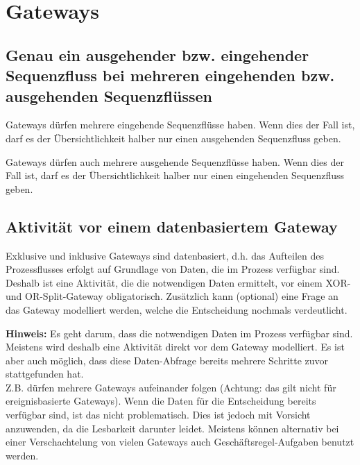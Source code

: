 \documentclass[12pt,report]{../../Templates/snetTeaching}
\begin{document}
\begin{Rahmen}
	\hfill
\end{Rahmen}







\clearpage
\section{Gateways}

\subsection{Genau ein ausgehender bzw. eingehender Sequenzfluss bei mehreren eingehenden bzw. ausgehenden Sequenzflüssen}


Gateways dürfen mehrere eingehende Sequenzflüsse haben. Wenn dies der Fall ist, darf es der Übersichtlichkeit halber nur einen ausgehenden Sequenzfluss geben.

Gateways dürfen auch mehrere ausgehende Sequenzflüsse haben. Wenn dies der Fall ist, darf es der Übersichtlichkeit halber nur einen eingehenden Sequenzfluss geben.

\begin{Rahmen}
	\hfill
\end{Rahmen}


\subsection{Aktivität vor einem datenbasiertem Gateway}

Exklusive und inklusive Gateways sind datenbasiert, d.h. das Aufteilen des Prozessflusses erfolgt auf Grundlage von Daten, die im Prozess verfügbar sind. Deshalb ist eine Aktivität, die die notwendigen Daten ermittelt, vor einem XOR- und OR-Split-Gateway obligatorisch. Zusätzlich kann (optional) eine Frage an das Gateway modelliert werden, welche die Entscheidung nochmals verdeutlicht.

\begin{Rahmen}
	\hfill
\end{Rahmen}

\textbf{Hinweis:} Es geht darum, dass die notwendigen Daten im Prozess verfügbar sind. Meistens wird deshalb eine Aktivität direkt vor dem Gateway modelliert. Es ist aber auch möglich, dass diese Daten-Abfrage bereits mehrere Schritte zuvor stattgefunden hat.\\
Z.B. dürfen mehrere Gateways aufeinander folgen (Achtung: das gilt nicht für ereignisbasierte Gateways). Wenn die Daten für die Entscheidung bereits verfügbar sind, ist das nicht problematisch. Dies ist jedoch mit Vorsicht anzuwenden, da die Lesbarkeit darunter leidet. Meistens können alternativ bei einer Verschachtelung von vielen Gateways auch Geschäftsregel-Aufgaben benutzt werden.
\end{document}
